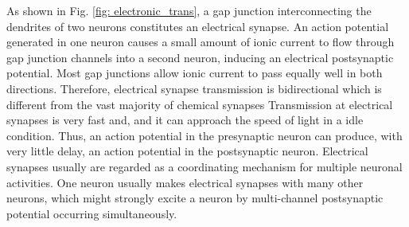 \documentclass[journal,comsoc]{IEEEtran}
\begin{document}
	As shown in Fig. \ref{fig: electronic_trans}, a gap junction interconnecting the dendrites of two neurons constitutes an electrical synapse.
	An action potential generated in one neuron causes a small amount of ionic current to flow through gap junction channels into a second neuron, 
	inducing an electrical postsynaptic potential.	
	Most gap junctions allow ionic current to pass equally well in both directions.
	Therefore, electrical synapse transmission is bidirectional which is different from the vast majority of chemical synapses
	Transmission at electrical synapses is very fast and, and it can approach the speed of light in a idle condition. 
	Thus, an action potential in the presynaptic neuron can produce, with very little delay, an action potential in the postsynaptic neuron. 
	Electrical synapses usually are regarded as a coordinating mechanism for multiple neuronal activities.
	One neuron usually  makes electrical synapses with many other neurons, which might strongly excite a neuron by multi-channel postsynaptic potential occurring simultaneously. 
	
	
\end{document}

